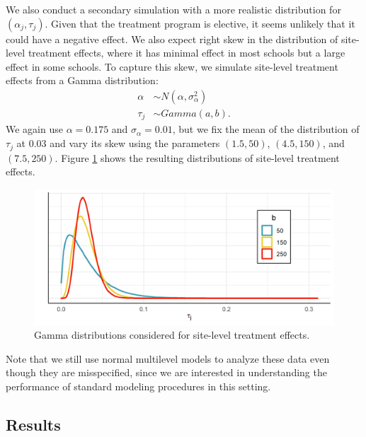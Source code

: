 \documentclass[]{article}
\begin{document}
We also conduct a secondary simulation with a more realistic distribution for $(\alpha_j, \tau_j)$.
Given that the treatment program is elective, it seems unlikely that it could have a negative effect.
We also expect right skew in the distribution of site-level treatment effects, where it has minimal effect in most schools but a large effect in some schools.
To capture this skew, we simulate site-level treatment effects from a Gamma distribution:
\begin{align*}
    \alpha &\sim N(\alpha, \sigma^2_\alpha) \\
    \tau_j &\sim Gamma(a, b).
\end{align*}
We again use $\alpha = 0.175$ and $\sigma_\alpha=0.01$, but we fix the mean of the distribution of $\tau_j$ at 0.03 and vary its skew using the parameters $(1.5, 50)$, $(4.5, 150)$, and $(7.5, 250)$.
Figure \ref{fig:gammas} shows the resulting distributions of site-level treatment effects.
\begin{figure}[t]
    \centering
    \includegraphics[width = \textwidth]{writeup/images/gamma.png}
    \caption{Gamma distributions considered for site-level treatment effects.}
    \label{fig:gammas}
\end{figure}
Note that we still use normal multilevel models to analyze these data even though they are misspecified, since we are interested in understanding the performance of standard modeling procedures in this setting.

\subsection{Results}
\end{document}
